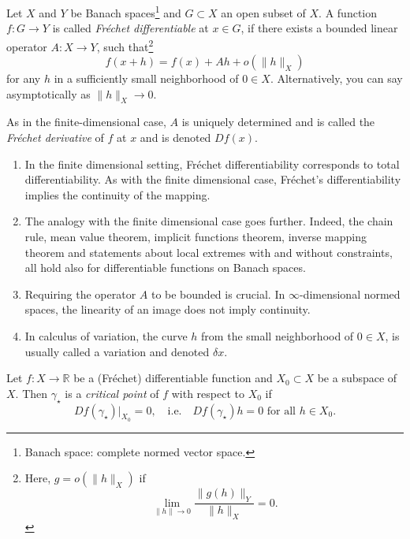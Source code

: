 \documentclass[english,fontsize=11pt,paper=a5,oneside]{scrbook}
\newcommand{\R}{\mathbb{R}}
\theoremstyle{definition}
\newenvironment{remark}
  {\pushQED{\qed}\renewcommand{\qedsymbol}{$\lozenge$}\remarkx}
  {\popQED\endremarkx}
\begin{document}
Let $X$ and $Y$ be Banach spaces\footnote{Banach space: complete normed vector space.}  and $G\subset X$ an open subset of $X$.
A function $f: G \to Y$ is called \emph{Fr\'echet differentiable} at $x\in G$, if there exists a bounded linear operator $A: X \to Y$, such that\footnote{Here, $g = o(\|h\|_X)$ if
  \begin{equation}
    \lim_{\|h\| \to 0} \frac{\|g(h)\|_Y}{\|h\|_X} = 0.
  \end{equation}
}
\begin{equation}\label{eq:frechetdiff}
  f(x+h) = f(x) + Ah + o(\|h\|_X)
\end{equation}
for any $h$ in a sufficiently small neighborhood of $0\in X$. Alternatively, you can say asymptotically as $\|h\|_X\to 0$.

As in the finite-dimensional case, $A$ is uniquely determined and is called the \emph{Fr\'echet derivative} of $f$ at $x$ and is denoted $D f(x)$.

\begin{remark}
  \begin{enumerate}
    \item In the finite dimensional setting, Fr\'echet differentiability corresponds to total differentiability. As with the finite dimensional case, Fr\'echet's differentiability implies the continuity of the mapping.
    \item The analogy with the finite dimensional case goes further. Indeed, the chain rule, mean value theorem, implicit functions theorem, inverse mapping theorem and statements about local extremes with and without constraints, all hold also for differentiable functions on Banach spaces.
    \item Requiring the operator $A$ to be bounded is crucial. In $\infty$-dimensional normed spaces, the linearity of an image does not imply continuity.
    \item In calculus of variation, the curve $h$ from the small neighborhood of $0\in X$, is usually called a variation and denoted $\delta x$.
  \end{enumerate}
\end{remark}

Let $f: X \to \R$ be a (Fr\'echet) differentiable function and $X_0 \subset X$ be a subspace of $X$. Then $\gamma_\star$ is a \emph{critical point} of $f$ with respect to $X_0$ if
\begin{equation}
  Df(\gamma_\star)\Big|_{X_0} = 0, \quad\mbox{i.e.}\quad
  Df(\gamma_\star)h = 0 \mbox{ for all } h\in X_0.
\end{equation}
\end{document}

